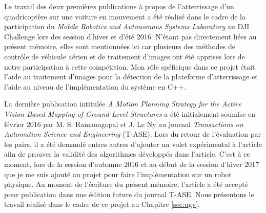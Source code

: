 Le travail des deux premières publications à propos de l'atterrissage d'un quadricoptère sur une voiture en mouvement a été réalisé dans le cadre de la participation du \textit{Mobile Robotics and Autonomous Systems Laboratory} au DJI Challenge lors des session d'hiver et d'été 2016. N'étant pas directement liées au présent mémoire, elles sont mentionnées ici car plusieurs des méthodes de contrôle de véhicule aérien et de traitement d'images ont été apprises lors de notre participation à cette compétition. Mon rôle spéficique dans ce projet était l'aide au traitement d'images pour la détection de la plateforme d'atterrissage et l'aide au niveau de l'implémentation du système en C++.

La dernière publication intitulée \textit{A Motion Planning Strategy for the Active Vision-Based Mapping of Ground-Level Structures} a été initialement soumise en février 2016 par M. S. Ramanagopal et J. Le Ny au journal \textit{Transactions on Automation Science and Engineering} (T-ASE). Lors du retour de l'évaluation par les pairs, il a été demandé entres autres d'ajouter un volet expérimental à l'article afin de prouver la validité des algorithmes développés dans l'article. C'est à ce moment, lors de la session d'automne 2016 et au début de la session d'hiver 2017 que je me suis ajouté au projet pour faire l'implémentation sur un robot physique. Au moment de l'écriture du présent mémoire, l'article a été accepté pour publication dans une édition future du journal T-ASE. Nous présentons le travail réalisé dans le cadre de ce projet au Chapitre \ref{sec:ugv}.




%
